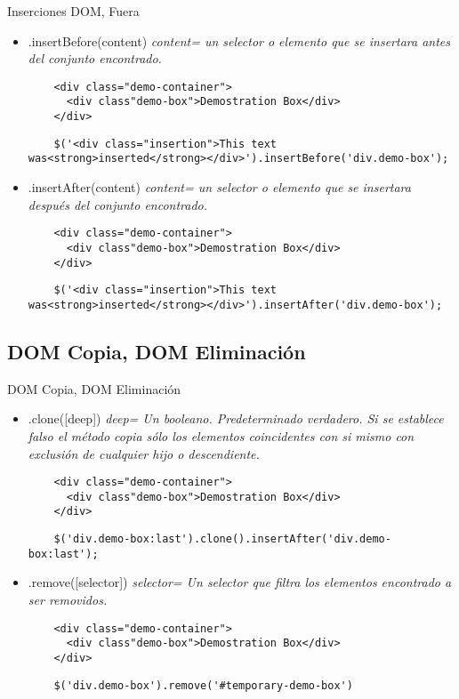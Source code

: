 \begin{frame}[fragile]{Inserciones DOM, Fuera} %
\begin{itemize}
    \item .insertBefore(content) \textit{ content= un selector o elemento que
    se insertara antes del conjunto encontrado.} 
    \begin{lstlisting}
    <div class="demo-container">
      <div class"demo-box">Demostration Box</div>
    </div>
    \end{lstlisting}
    \begin{lstlisting}
    $('<div class="insertion">This text was<strong>inserted</strong></div>').insertBefore('div.demo-box');
    \end{lstlisting}
    \item .insertAfter(content) \textit{ content= un selector o elemento que se insertara después del conjunto encontrado.} 
    \begin{lstlisting}
    <div class="demo-container">
      <div class"demo-box">Demostration Box</div>
    </div>
    \end{lstlisting}
    \begin{lstlisting}
    $('<div class="insertion">This text was<strong>inserted</strong></div>').insertAfter('div.demo-box');
    \end{lstlisting}
\end{itemize}
\end{frame}

\subsection{DOM Copia, DOM Eliminación} %

\begin{frame}[fragile]{DOM Copia, DOM Eliminación} %
\begin{itemize}
    \item .clone([deep]) \textit{ deep= Un booleano. Predeterminado verdadero. Si se establece falso el método copia sólo los elementos coincidentes con si mismo con exclusión de cualquier hijo o descendiente.} 
    \begin{lstlisting}
    <div class="demo-container">
      <div class"demo-box">Demostration Box</div>
    </div>
    \end{lstlisting}
    \begin{lstlisting}
    $('div.demo-box:last').clone().insertAfter('div.demo-box:last');
    \end{lstlisting}
    \item .remove([selector]) \textit{ selector= Un selector que filtra los elementos encontrado a ser removidos.} 
    \begin{lstlisting}
    <div class="demo-container">
      <div class"demo-box">Demostration Box</div>
    </div>
    \end{lstlisting}
    \begin{lstlisting}
    $('div.demo-box').remove('#temporary-demo-box')
    \end{lstlisting}
\end{itemize}
\end{frame}

